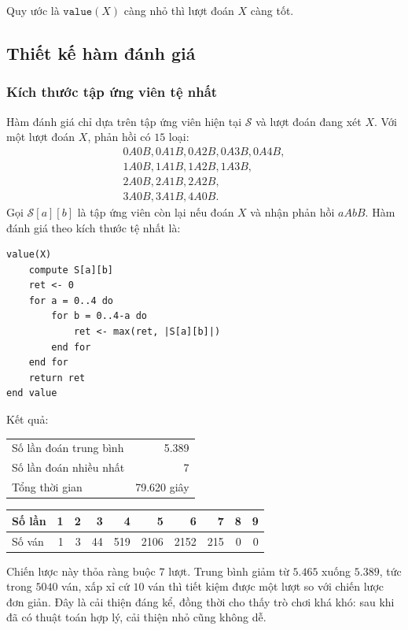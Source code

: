 \documentclass[11pt]{article}
\newcommand{\AB}[2]{#1A#2B}
\newcommand{\SetS}{\mathcal{S}}
\begin{document}
Quy ước là \(\texttt{value}(X)\) càng nhỏ thì lượt đoán \(X\) càng tốt.

\subsection{Thiết kế hàm đánh giá}

\subsubsection{Kích thước tập ứng viên tệ nhất}

Hàm đánh giá chỉ dựa trên tập ứng viên hiện tại \(\SetS\) và lượt đoán đang
xét \(X\). Với một lượt đoán \(X\), phản hồi có \(15\) loại:
\[
\begin{gathered}
\AB{0}{0},\AB{0}{1},\AB{0}{2},\AB{0}{3},\AB{0}{4},\\
\AB{1}{0},\AB{1}{1},\AB{1}{2},\AB{1}{3},\\
\AB{2}{0},\AB{2}{1},\AB{2}{2},\\
\AB{3}{0},\AB{3}{1},\AB{4}{0}.
\end{gathered}
\]
Gọi \(\SetS[a][b]\) là tập ứng viên còn lại nếu đoán \(X\) và nhận phản hồi
\(aAbB\). Hàm đánh giá theo kích thước tệ nhất là:
\begin{verbatim}
value(X)
    compute S[a][b]
    ret <- 0
    for a = 0..4 do
        for b = 0..4-a do
            ret <- max(ret, |S[a][b]|)
        end for
    end for
    return ret
end value
\end{verbatim}

Kết quả:
\begin{center}
\small
\begin{tabular}{|l|r|}
\hline
Số lần đoán trung bình & 5.389 \\
Số lần đoán nhiều nhất & 7 \\
Tổng thời gian & 79.620 giây \\
\hline
\end{tabular}

\medskip
\begin{tabular}{|l|rrrrrrrrr|}
\hline
Số lần & 1 & 2 & 3 & 4 & 5 & 6 & 7 & 8 & 9 \\
\hline
Số ván & 1 & 3 & 44 & 519 & 2106 & 2152 & 215 & 0 & 0 \\
\hline
\end{tabular}
\end{center}

Chiến lược này thỏa ràng buộc \(7\) lượt. Trung bình giảm từ \(5.465\) xuống
\(5.389\), tức trong \(5040\) ván, xấp xỉ cứ \(10\) ván thì tiết kiệm được một
lượt so với chiến lược đơn giản. Đây là cải thiện đáng kể, đồng thời cho thấy
trò chơi khá khó: sau khi đã có thuật toán hợp lý, cải thiện nhỏ cũng không
dễ.
\end{document}
